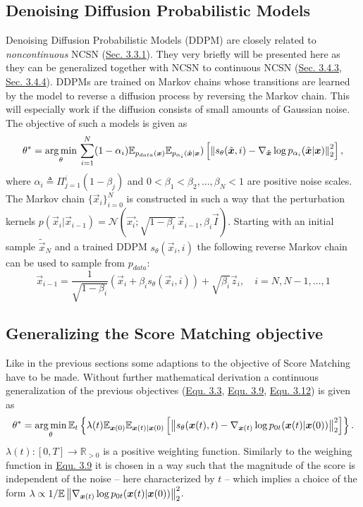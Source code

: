 \subsection{Denoising Diffusion Probabilistic Models}
Denoising Diffusion Probabilistic Models (DDPM) \cite{ho2020denoising} are closely related to \textit{noncontinuous} NCSN (\hyperref[sec:3.3.1]{Sec. 3.3.1}). They very briefly will be presented here as they can be generalized together with NCSN to continuous NCSN (\hyperref[sec:3.4.3]{Sec. 3.4.3}, \hyperref[sec:3.4.4]{Sec. 3.4.4}). DDPMs are trained on Markov chains whose transitions are learned by the model to reverse a diffusion process by reversing the Markov chain. This will especially work if the diffusion consists of small amounts of Gaussian noise. The objective of such a models is given as 
%
\begin{equation} \label{equ:3.12} 
    \theta^*=\underset{\theta}{\arg\min}\,\sum_{i=1}^N(1-\alpha_i)\mathbb{E}_{p_{data}(\boldsymbol{x})}\mathbb{E}_{p_{\alpha_i}(\tilde{\boldsymbol{x}}|\boldsymbol{x}})\left[\left\lVert s_\theta(\tilde{\boldsymbol{x}},i)-\nabla_{\tilde{\boldsymbol{x}}}\log p_{\alpha_i}(\tilde{\boldsymbol{x}}|\boldsymbol{x})\right\rVert_2^2\right],
\end{equation}
%
where $\alpha_i\triangleq\Pi_{j=1}^i(1-\beta_j)$ and $0<\beta_1<\beta_2,\dots,\beta_N<1$ are positive noise scales. The Markov chain $\{\vec{x}_i\}_{i=0}^N$ is constructed in such a way that the perturbation kernels $p(\vec{x}_i|\vec{x}_{i-1})=\mathcal{N}(\vec{x_i};\sqrt{1-\beta_i}\,\vec{x}_{i-1},\beta_i\vec{I})$. Starting with an initial sample $\tilde{\vec{x}}_N$ and a trained DDPM $s_\theta(\vec{x}_i, i)$ the following reverse Markov chain can be used to sample from $p_{data}$:
%
\begin{equation} \label{equ:3.13}
    \vec{x}_{i-1}=\frac{1}{\sqrt{1-\beta_i}}(\vec{x}_i+\beta_is_\theta(\vec{x}_i,i))+\sqrt{\beta_i}\vec{z}_i,\quad i=N,N-1,\dots,1
\end{equation}
%
\subsection{Generalizing the Score Matching objective} \label{sec:3.4.3}
Like in the previous sections some adaptions to the objective of Score Matching have to be made. Without further mathematical derivation a continuous generalization of the previous objectives (\hyperref[equ:3.3]{Equ. 3.3}, \hyperref[equ:3.9]{Equ. 3.9}, \hyperref[equ:3.12]{Equ. 3.12}) is given as
%
\begin{equation} \label{equ:3.14}
    \theta^*=\underset{\theta}{\arg\min}\,\mathbb{E}_t\left\{\lambda(t)\mathbb{E}_{\boldsymbol{x}(0)}\mathbb{E}_{\boldsymbol{x}(t)|\boldsymbol{x}(0)}\left[\left\lVert s_\theta(\boldsymbol{x}(t),t)-\nabla_{\boldsymbol{x}(t)}\log p_{0t}(\boldsymbol{x}(t)|\boldsymbol{x}(0))\right\rVert_2^2\right]\right\}.
\end{equation}
%
$\lambda(t):[0,T]\rightarrow\mathbb{R}_{>0}$ is a positive weighting function. Similarly to the weighing function in \hyperref[equ:3.9]{Equ. 3.9} it is chosen in a way such that the magnitude of the score is independent of the noise – here characterized by $t$ – which implies a choice of the form $\lambda\propto 1/\mathbb{E}\left\lVert\nabla_{\boldsymbol{x}(t)}\log p_{0t}(\boldsymbol{x}(t)|\boldsymbol{x}(0))\right\rVert_2^2$.


